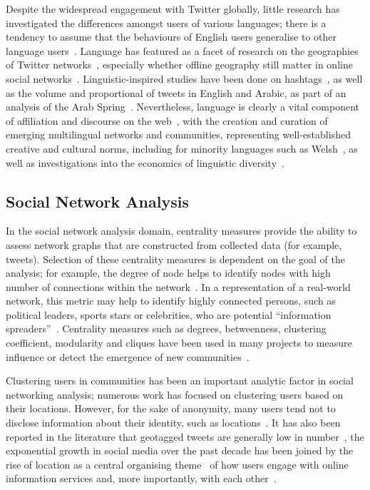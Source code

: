 Despite the widespread engagement with Twitter globally, little
research has investigated the differences amongst users of various
languages; there is a tendency to assume that the behaviours of
English users generalise to other language
users~\cite{hong-et-al:2011}. Language has featured as a facet of
research on the geographies of Twitter
networks~\cite{takhteyev-et-al:2012}, especially whether offline
geography still matter in online social
networks~\cite{kulshrestha-et-al:2012}. Linguistic-inspired studies
have been done on hashtags~\cite{cunha-et-al:2011}, as well as the
volume and proportional of tweets in English and Arabic, as part of an
analysis of the Arab Spring~\cite{bruns-et-al:2013}. Nevertheless,
language is clearly a vital component of affiliation and discourse on
the web~\cite{zappavigna+martin:2012}, with the creation and curation
of emerging multilingual networks and communities, representing
well-established creative and cultural norms, including for minority
languages such as Welsh~\cite{gj+uj:2013}, as well as investigations
into the economics of linguistic
diversity~\cite{ginsburgh+weber:2011}.

\subsection{Social Network Analysis}

In the social network analysis domain, centrality measures
provide the ability to assess network graphs that are constructed from
collected data (for example, tweets). Selection of these centrality
measures is dependent on the goal of the analysis; for example, the
degree of node helps to identify nodes with high number of connections
within the
network~\cite{borgatti+everett:2000,rombach-et-al:2014,liu-et-al:2014}.
In a representation of a real-world network, this metric may help to
identify highly connected persons, such as political leaders, sports
stars or celebrities, who are potential ``information
spreaders''~\cite{cha-et-al:2012,borge-holthoefer-et-al:2012,zhang-et-al:2016}.
Centrality measures such as degrees, betweenness, clustering
coefficient, modularity and cliques have been used in many projects to
measure influence or detect the emergence of new
communities~\cite{willis-et-al:2015,oatley+crick:2015}.

Clustering users in communities has been an important analytic factor
in social networking analysis; numerous work has focused on clustering
users based on their locations. However, for the sake of anonymity,
many users tend not to disclose information about their identity, such
as locations~\cite{kang-et-al:2013}. It has also been reported in the
literature that geotagged tweets are generally low in
number~\cite{morstatter-et-al:2013,tan-et-al:2013,kumar-et-al:2014},
the exponential growth in social media over the past decade has been
joined by the rise of location as a central organising
theme~\cite{liang-et-al:2013} of how users engage with online
information services and, more importantly, with each
other~\cite{cheng-et-al:2010,caverlee-et-al:2013}.


